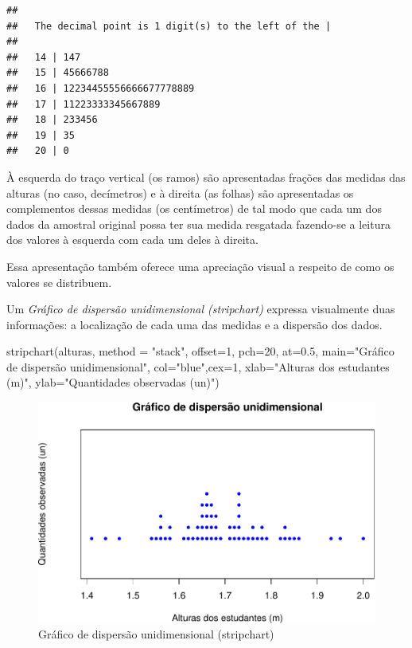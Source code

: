 \documentclass[
]{book}
\newenvironment{Shaded}{\begin{snugshade}}{\end{snugshade}}
\newcommand{\AttributeTok}[1]{\textcolor[rgb]{0.77,0.63,0.00}{#1}}
\newcommand{\DecValTok}[1]{\textcolor[rgb]{0.00,0.00,0.81}{#1}}
\newcommand{\FloatTok}[1]{\textcolor[rgb]{0.00,0.00,0.81}{#1}}
\newcommand{\FunctionTok}[1]{\textcolor[rgb]{0.00,0.00,0.00}{#1}}
\newcommand{\NormalTok}[1]{#1}
\newcommand{\StringTok}[1]{\textcolor[rgb]{0.31,0.60,0.02}{#1}}
\begin{document}
\begin{verbatim}
## 
##   The decimal point is 1 digit(s) to the left of the |
## 
##   14 | 147
##   15 | 45666788
##   16 | 12234455556666677778889
##   17 | 11223333345667889
##   18 | 233456
##   19 | 35
##   20 | 0
\end{verbatim}

\hfill\break

À esquerda do traço vertical (os ramos) são apresentadas frações das medidas das alturas (no caso, decímetros) e à direita (as folhas) são apresentadas os complementos dessas medidas (os centímetros) de tal modo que cada um dos dados da amostral original possa ter sua medida resgatada fazendo-se a leitura dos valores à esquerda com cada um deles à direita.

\hfill\break

Essa apresentação também oferece uma apreciação visual a respeito de como os valores se distribuem.

\hfill\break

Um \emph{Gráfico de dispersão unidimensional (stripchart)} expressa visualmente duas informações: a localização de cada uma das medidas e a dispersão dos dados.

\hfill\break

\begin{Shaded}
\begin{Highlighting}[]
\FunctionTok{stripchart}\NormalTok{(alturas, }\AttributeTok{method =} \StringTok{"stack"}\NormalTok{, }\AttributeTok{offset=}\DecValTok{1}\NormalTok{,}
           \AttributeTok{pch=}\DecValTok{20}\NormalTok{, }\AttributeTok{at=}\FloatTok{0.5}\NormalTok{,}
           \AttributeTok{main=}\StringTok{"Gráfico de dispersão unidimensional"}\NormalTok{,}
           \AttributeTok{col=}\StringTok{"blue"}\NormalTok{,}\AttributeTok{cex=}\DecValTok{1}\NormalTok{,}
           \AttributeTok{xlab=}\StringTok{"Alturas dos estudantes (m)"}\NormalTok{,}
           \AttributeTok{ylab=}\StringTok{"Quantidades observadas (un)"}\NormalTok{)}
\end{Highlighting}
\end{Shaded}

\begin{figure}

{\centering \includegraphics[width=0.8\linewidth]{apostila_files/figure-latex/unnamed-chunk-18-1} 

}

\caption{Gráfico de dispersão unidimensional (stripchart)}\label{fig:unnamed-chunk-18}
\end{figure}
\end{document}
